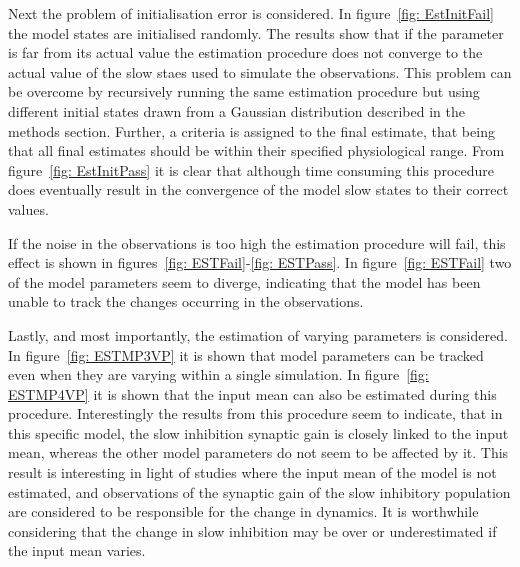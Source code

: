 Next the problem of initialisation error is considered. In figure~\ref{fig: EstInitFail} the model states are initialised randomly. The results show that if the parameter is far from its actual value the estimation procedure does not converge to the actual value of the slow staes used to simulate the observations. This problem can be overcome by recursively running the same estimation procedure but using different initial states drawn from a Gaussian distribution described in the methods section. Further, a criteria is assigned to the final estimate, that being that all final estimates should be within their specified physiological range. From figure~\ref{fig: EstInitPass} it is clear that although time consuming this procedure does eventually result in the convergence of the model slow states to their correct values. 


If the noise in the observations is too high the estimation procedure will fail, this effect is shown in figures~\ref{fig: ESTFail}-\ref{fig: ESTPass}. In figure~\ref{fig: ESTFail} two of the model parameters seem to diverge, indicating that the model has been unable to track the changes occurring in the observations.

Lastly, and most importantly, the estimation of varying parameters is considered. In figure~\ref{fig: ESTMP3VP} it is shown that model parameters can be tracked even when they are varying within a single simulation. In figure~\ref{fig: ESTMP4VP} it is shown that the input mean can also be estimated during this procedure. Interestingly the results from this procedure seem to indicate, that in this specific model, the slow inhibition synaptic gain is closely linked to the input mean, whereas the other model parameters do not seem to be affected by it. This result is interesting in light of studies where the input mean of the model is not estimated, and observations of the synaptic gain of the slow inhibitory population are considered to be responsible for the change in dynamics. It is worthwhile considering that the change in slow inhibition may be over or underestimated if the input mean varies.

